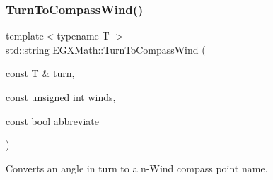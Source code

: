 \subsubsection{\texorpdfstring{Turn\+To\+Compass\+Wind()}{TurnToCompassWind()}}
{\footnotesize\ttfamily template$<$typename T $>$ \\
std\+::string E\+G\+X\+Math\+::\+Turn\+To\+Compass\+Wind (\begin{DoxyParamCaption}\item[{const T \&}]{turn,  }\item[{const unsigned int}]{winds,  }\item[{const bool}]{abbreviate }\end{DoxyParamCaption})}



Converts an angle in turn to a n-\/\+Wind compass point name. 

